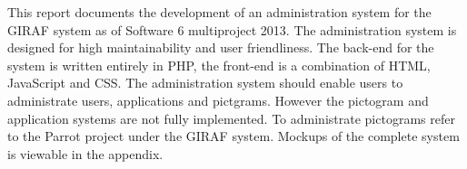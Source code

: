 This report documents the development of an administration system for the GIRAF system as of Software 6 multiproject 2013. The administration system is designed for high maintainability and user friendliness. The back-end for the system is written entirely in PHP, the front-end is a combination of HTML, JavaScript and CSS. The administration system should enable users to administrate users, applications and pictgrams. However the pictogram and application systems are not fully implemented. To administrate pictograms refer to the Parrot project under the GIRAF system. Mockups of the complete system is viewable in the appendix.